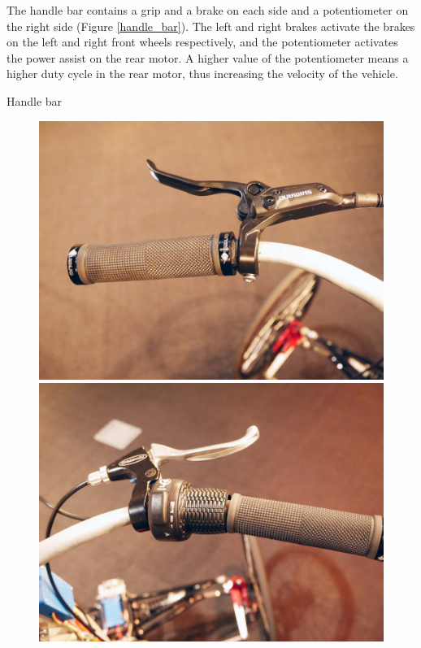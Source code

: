 The handle bar contains a grip and a brake on each side and a potentiometer on the right side (Figure \ref{handle_bar}). The left and right brakes activate the brakes on the left and right front wheels respectively, and the potentiometer activates the power assist on the rear motor. A higher value of the potentiometer means a higher duty cycle in the rear motor, thus increasing the velocity of the vehicle.
\begin{marginfigure}
	\caption{Handle bar}
	\label{handle_bar}
\end{marginfigure}
\begin{figure}[h]
		  \includegraphics[width=1.0\linewidth]{figs/05/P10507342}
		\endminipage\hfill
		\hspace{1pt}
		  \includegraphics[width=1.0\linewidth]{figs/05/P10507332}
		\endminipage
		\\[0pt]
\end{figure}

